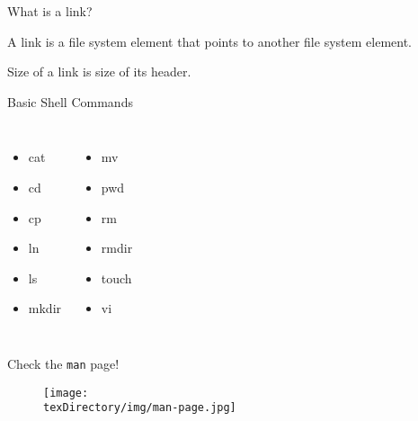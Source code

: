 \documentclass[compress]{beamer}
\begin{document}
\begin{slide}
	\begin{block}{What is a link?}

	A link is a file system element that points to another file system element.

	Size of a link is size of its header.

	\end{block}
\end{slide}

\begin{slide}
	\begin{block}{Basic Shell Commands}

	\begin{columns}
		\begin{itemize}
		\item[] cat
		\item[] cd
		\item[] cp
		\item[] ln
		\item[] ls
		\item[] mkdir
		\end{itemize}
		\begin{itemize}
		\item[] mv
		\item[] pwd
		\item[] rm
		\item[] rmdir
		\item[] touch
		\item[] vi
		\end{itemize}
	\end{columns}

	\end{block}
\end{slide}

\begin{slide}
	\begin{block}{Check the \texttt{man} page!}

	\begin{figure}
	\texttt{[image: \\texDirectory/img/man-page.jpg]}
	\end{figure}

	\end{block}
\end{slide}
\end{document}
